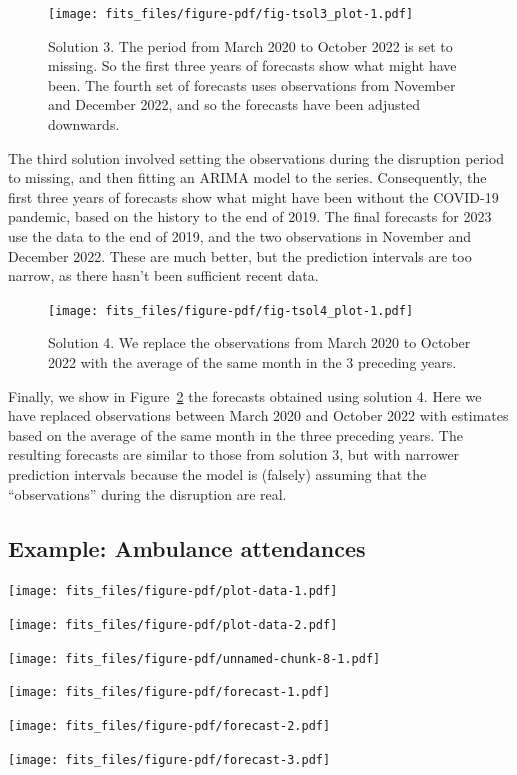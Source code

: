 \documentclass[11pt,a4paper,]{article}
\begin{document}
\begin{figure}[t]

{\centering \texttt{[image: fits\_files/figure-pdf/fig-tsol3\_plot-1.pdf]}

}

\caption{\label{fig-tsol3_plot}Solution 3. The period from March 2020 to
October 2022 is set to missing. So the first three years of forecasts
show what might have been. The fourth set of forecasts uses observations
from November and December 2022, and so the forecasts have been adjusted
downwards.}

\end{figure}

The third solution involved setting the observations during the
disruption period to missing, and then fitting an ARIMA model to the
series. Consequently, the first three years of forecasts show what might
have been without the COVID-19 pandemic, based on the history to the end
of 2019. The final forecasts for 2023 use the data to the end of 2019,
and the two observations in November and December 2022. These are much
better, but the prediction intervals are too narrow, as there hasn't
been sufficient recent data.

\begin{figure}[t]

{\centering \texttt{[image: fits\_files/figure-pdf/fig-tsol4\_plot-1.pdf]}

}

\caption{\label{fig-tsol4_plot}Solution 4. We replace the observations
from March 2020 to October 2022 with the average of the same month in
the 3 preceding years.}

\end{figure}

Finally, we show in Figure~\ref{fig-tsol4_plot} the forecasts obtained
using solution 4. Here we have replaced observations between March 2020
and October 2022 with estimates based on the average of the same month
in the three preceding years. The resulting forecasts are similar to
those from solution 3, but with narrower prediction intervals because
the model is (falsely) assuming that the ``observations'' during the
disruption are real.

\FloatBarrier

\hypertarget{example-ambulance-attendances}{%
\subsection{Example: Ambulance
attendances}\label{example-ambulance-attendances}}

\texttt{[image: fits\_files/figure-pdf/plot-data-1.pdf]}

\texttt{[image: fits\_files/figure-pdf/plot-data-2.pdf]}

\texttt{[image: fits\_files/figure-pdf/unnamed-chunk-8-1.pdf]}

\texttt{[image: fits\_files/figure-pdf/forecast-1.pdf]}

\texttt{[image: fits\_files/figure-pdf/forecast-2.pdf]}

\texttt{[image: fits\_files/figure-pdf/forecast-3.pdf]}

\printbibliography
\end{document}
